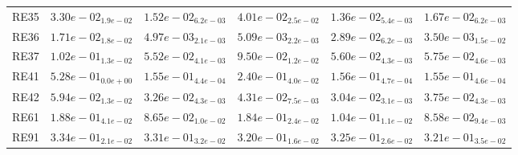 \documentclass{article}
\begin{document}
\begin{table}
\begin{scriptsize}
\begin{tabular}{llllll}
RE35 & $  3.30e-02_{ 1.9e-02}$ & \cellcolor{gray25}$  1.52e-02_{ 6.2e-03}$ & $  4.01e-02_{ 2.5e-02}$ & \cellcolor{gray95}$  1.36e-02_{ 5.4e-03}$ & $  1.67e-02_{ 6.2e-03}$ \\
RE36 & $  1.71e-02_{ 1.8e-02}$ & \cellcolor{gray25}$  4.97e-03_{ 2.1e-03}$ & $  5.09e-03_{ 2.2e-03}$ & $  2.89e-02_{ 6.2e-03}$ & \cellcolor{gray95}$  3.50e-03_{ 1.5e-02}$ \\
RE37 & $  1.02e-01_{ 1.3e-02}$ & \cellcolor{gray95}$  5.52e-02_{ 4.1e-03}$ & $  9.50e-02_{ 1.2e-02}$ & \cellcolor{gray25}$  5.60e-02_{ 4.3e-03}$ & $  5.75e-02_{ 4.6e-03}$ \\
RE41 & $  5.28e-01_{ 0.0e+00}$ & \cellcolor{gray95}$  1.55e-01_{ 4.4e-04}$ & $  2.40e-01_{ 4.0e-02}$ & $  1.56e-01_{ 4.7e-04}$ & \cellcolor{gray25}$  1.55e-01_{ 4.6e-04}$ \\
RE42 & $  5.94e-02_{ 1.3e-02}$ & \cellcolor{gray25}$  3.26e-02_{ 4.3e-03}$ & $  4.31e-02_{ 7.5e-03}$ & \cellcolor{gray95}$  3.04e-02_{ 3.1e-03}$ & $  3.75e-02_{ 4.3e-03}$ \\
RE61 & $  1.88e-01_{ 4.1e-02}$ & \cellcolor{gray25}$  8.65e-02_{ 1.0e-02}$ & $  1.84e-01_{ 2.4e-02}$ & $  1.04e-01_{ 1.1e-02}$ & \cellcolor{gray95}$  8.58e-02_{ 9.4e-03}$ \\
RE91 & $  3.34e-01_{ 2.1e-02}$ & $  3.31e-01_{ 3.2e-02}$ & \cellcolor{gray95}$  3.20e-01_{ 1.6e-02}$ & $  3.25e-01_{ 2.6e-02}$ & \cellcolor{gray25}$  3.21e-01_{ 3.5e-02}$ \\
\hline
\end{tabular}
\end{scriptsize}
\end{table}
\end{document}
